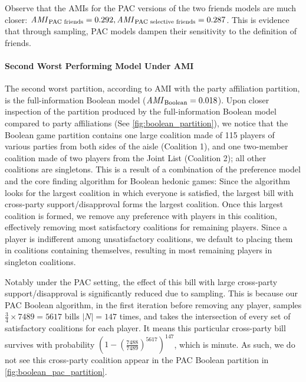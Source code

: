Observe that the AMIs for the PAC versions of the two friends models are much
closer: $\mathit{AMI}_{\text{PAC friends}} = 0.292,
\mathit{AMI}_{\text{PAC selective friends}} = 0.287$.
This is evidence that through sampling, PAC models dampen their sensitivity to
the definition of friends.

\paragraph{Second Worst Performing Model Under AMI} 
The second worst partition, according to AMI with the party affiliation
partition, is the full-information Boolean model ($\mathit{AMI}_{\text{Boolean}} = 0.018$).
Upon closer inspection of the partition produced by the full-information Boolean
model compared to party affiliations (See \autoref{fig:boolean_partition}),
we notice that the Boolean game partition contains one large coalition made of 115
players of various parties from both sides of the aisle (Coalition 1),
and one two-member coalition made of two players from the Joint List (Coalition 2);
all other coalitions are singletons.
This is a result of a combination of the preference model and the core finding
algorithm for Boolean hedonic games:
Since the algorithm looks for the largest coalition in which everyone is
satisfied, the largest bill with cross-party support/disapproval forms the
largest coalition.
Once this largest coalition is formed, we remove any preference with players
in this coalition, effectively removing most satisfactory coalitions for
remaining players.
Since a player is indifferent among unsatisfactory coalitions, we default to
placing them in coalitions containing themselves, resulting in most remaining
players in singleton coalitions.

Notably under the PAC setting, the effect of this bill with large cross-party
support/disapproval is significantly reduced due to sampling.
This is because our PAC Boolean algorithm, in the first iteration before removing
any player, samples $\frac{3}{4} \times 7489 = 5617$ bills $|N|=147$ times, and
takes the intersection of every set of satisfactory coalitions for each player.
It means this particular cross-party bill survives with probability
$(1 - (\frac{7488}{7489})^{5617})^{147}$, which is minute.
As such, we do not see this cross-party coalition appear in the PAC Boolean
partition in \autoref{fig:boolean_pac_partition}.

